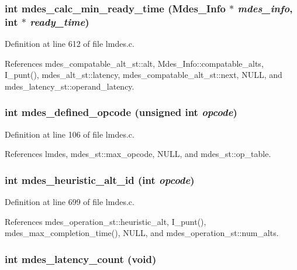 \subsubsection{\setlength{\rightskip}{0pt plus 5cm}int mdes\_\-calc\_\-min\_\-ready\_\-time (\bf{Mdes\_\-Info} $\ast$ {\em mdes\_\-info}, int $\ast$ {\em ready\_\-time})}\label{lmdes_8c_aa82b5ba2b71f304d335536fd6ee607f}




Definition at line 612 of file lmdes.c.

References mdes\_\-compatable\_\-alt\_\-st::alt, Mdes\_\-Info::compatable\_\-alts, I\_\-punt(), mdes\_\-alt\_\-st::latency, mdes\_\-compatable\_\-alt\_\-st::next, NULL, and mdes\_\-latency\_\-st::operand\_\-latency.
\subsubsection{\setlength{\rightskip}{0pt plus 5cm}int mdes\_\-defined\_\-opcode (unsigned int {\em opcode})}\label{lmdes_8c_ac3528f18876ca767f050631903e3552}




Definition at line 106 of file lmdes.c.

References lmdes, mdes\_\-st::max\_\-opcode, NULL, and mdes\_\-st::op\_\-table.
\subsubsection{\setlength{\rightskip}{0pt plus 5cm}int mdes\_\-heuristic\_\-alt\_\-id (int {\em opcode})}\label{lmdes_8c_bcb6214dbe99b2a5c7b4fb47cc0b632e}




Definition at line 699 of file lmdes.c.

References mdes\_\-operation\_\-st::heuristic\_\-alt, I\_\-punt(), mdes\_\-max\_\-completion\_\-time(), NULL, and mdes\_\-operation\_\-st::num\_\-alts.
\subsubsection{\setlength{\rightskip}{0pt plus 5cm}int mdes\_\-latency\_\-count (void)}\label{lmdes_8c_7c180927e995b9efb844141769e8752a}





